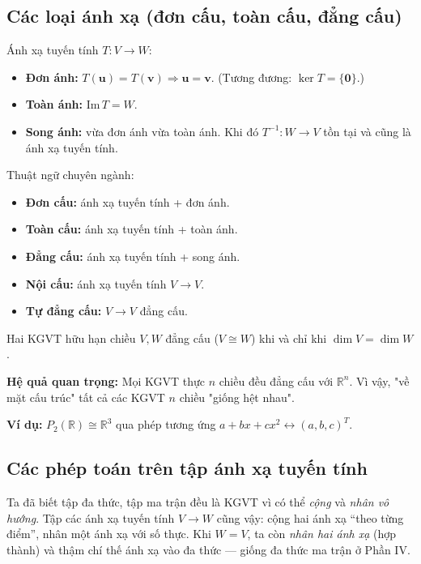 \documentclass[12pt,a4paper]{article}
\begin{document}
\subsection{Các loại ánh xạ (đơn cấu, toàn cấu, đẳng cấu)}

\begin{dinhnghia}
  Ánh xạ tuyến tính $T: V \to W$:
  \begin{itemize}
    \item \textbf{Đơn ánh:} $T(\mathbf{u}) = T(\mathbf{v}) \Rightarrow \mathbf{u} = \mathbf{v}$. (Tương đương: $\ker T = \{\mathbf{0}\}$.)
    \item \textbf{Toàn ánh:} $\mathrm{Im}\, T = W$.
    \item \textbf{Song ánh:} vừa đơn ánh vừa toàn ánh. Khi đó $T^{-1}: W \to V$ tồn tại và cũng là ánh xạ tuyến tính.
  \end{itemize}

  Thuật ngữ chuyên ngành:
  \begin{itemize}
    \item \textbf{Đơn cấu:} ánh xạ tuyến tính + đơn ánh.
    \item \textbf{Toàn cấu:} ánh xạ tuyến tính + toàn ánh.
    \item \textbf{Đẳng cấu:} ánh xạ tuyến tính + song ánh.
    \item \textbf{Nội cấu:} ánh xạ tuyến tính $V \to V$.
    \item \textbf{Tự đẳng cấu:} $V \to V$ đẳng cấu.
  \end{itemize}
\end{dinhnghia}

\begin{dinhly}[title={Định lý về đẳng cấu}]
Hai KGVT hữu hạn chiều $V, W$ đẳng cấu ($V \cong W$) khi và chỉ khi $\dim V = \dim W$.

\textbf{Hệ quả quan trọng:} Mọi KGVT thực $n$ chiều đều đẳng cấu với $\mathbb{R}^n$. Vì vậy, "về mặt cấu trúc" tất cả các KGVT $n$ chiều "giống hệt nhau".

\textbf{Ví dụ:} $P_2(\mathbb{R}) \cong \mathbb{R}^3$ qua phép tương ứng $a + bx + cx^2 \leftrightarrow (a, b, c)^T$.
\end{dinhly}

\subsection{Các phép toán trên tập ánh xạ tuyến tính}

\begin{dongco}
Ta đã biết tập đa thức, tập ma trận đều là KGVT vì có thể \emph{cộng} và \emph{nhân vô hướng}. Tập các ánh xạ tuyến tính $V \to W$ cũng vậy: cộng hai ánh xạ ``theo từng điểm'', nhân một ánh xạ với số thực. Khi $W = V$, ta còn \emph{nhân hai ánh xạ} (hợp thành) và thậm chí thế ánh xạ vào đa thức --- giống đa thức ma trận ở Phần IV.
\end{dongco}
\end{document}
